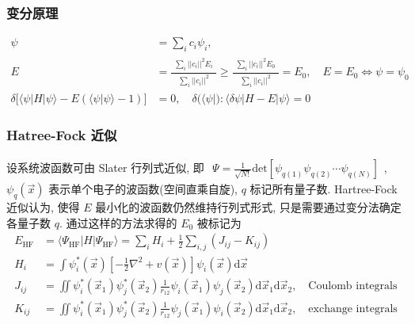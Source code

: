 \documentclass[../../main.tex]{subfiles}
\begin{document}
\subsubsection{变分原理}
\begin{align*}
  \psi &= \sum_{i}c_{i}\psi_{i},\\
  E &= \frac{\begin{aligned}
    \sum_{i}||c_{i}||^{2}E_{i}
  \end{aligned}}{\begin{aligned}
    \sum_{i}||c_{i}||^{2}
  \end{aligned}}\geq \frac{\begin{aligned}
    \sum_{i}||c_{i}||^{2}E_{0}
  \end{aligned}}{\begin{aligned}
    \sum_{i}||c_{i}||^{2}
  \end{aligned}} = E_{0}, \quad E = E_{0}\iff \psi = \psi_{0}\\
  \delta\big[\langle\psi|H|\psi\rangle - E(\langle\psi|\psi\rangle-1)\big] &= 0,\quad \delta(\langle\psi|): \langle\delta\psi|H-E|\psi\rangle = 0
\end{align*}
\subsubsection{Hatree-Fock 近似}
设系统波函数可由 Slater 行列式近似, 即 $\begin{aligned}
  \Psi = \frac{1}{\sqrt{N!}}\text{det}[\psi_{q(1)}\psi_{q(2)}\cdots\psi_{q(N)}]
\end{aligned}$, $\psi_{q}(\vec{x})$ 表示单个电子的波函数(空间直乘自旋), $q$ 标记所有量子数. Hartree-Fock 近似认为, 使得 $E$ 最小化的波函数仍然维持行列式形式, 只是需要通过变分法确定各量子数 $q$. 通过这样的方法求得的 $E_{0}$ 被标记为
\begin{align*}
  E_{\text{HF}} &= \langle\Psi_{\text{HF}}|H|\Psi_{\text{HF}}\rangle = \sum_{i}H_{i} + \frac{1}{2}\sum_{i,j}(J_{ij} - K_{ij})\\
  H_{i} &= \int\psi_{i}^{*}(\vec{x})\left[-\frac{1}{2}\nabla^{2}+v(\vec{x})\right]\psi_{i}(\vec{x})\mathrm{d}\vec{x}\\
  J_{ij} &= \iint
  \psi_{i}^{*}(\vec{x}_{1})
  \psi_{j}^{*}(\vec{x}_{2})
  \frac{1}{r_{12}}
  \psi_{i}(\vec{x}_{1})
  \psi_{j}(\vec{x}_{2})\mathrm{d}\vec{x}_{1}\mathrm{d}\vec{x}_{2},\quad \text{Coulomb integrals}\\
  K_{ij} &= \iint
  \psi_{i}^{*}(\vec{x}_{1})
  \psi_{j}^{*}(\vec{x}_{2})
  \frac{1}{r_{12}}
  \psi_{j}(\vec{x}_{1})
  \psi_{i}(\vec{x}_{2})
  \mathrm{d}\vec{x}_{1}\mathrm{d}\vec{x}_{2},\quad\text{exchange integrals}
\end{align*}
\end{document}
